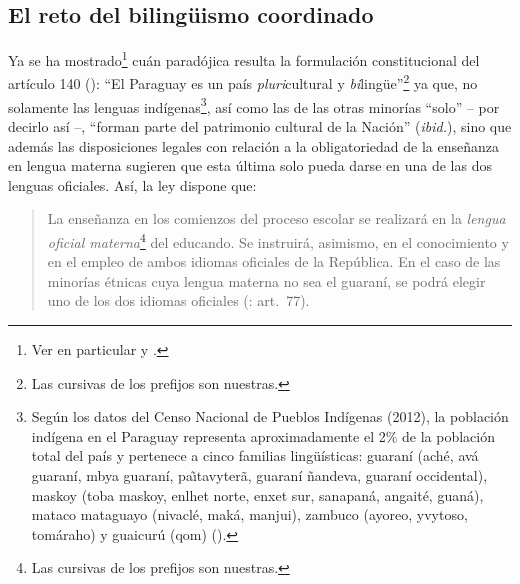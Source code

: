 \documentclass[output=paper]{langscibook}
\begin{document}
\subsection{El reto del bilingüismo coordinado}


Ya se ha mostrado\footnote{Ver en particular \citet{Penner2010} y  \citet{ZuccolilloFrench2002}.}  cuán paradójica resulta la formulación constitucional del artículo 140 (\citealt{RepúblicadelParaguay1992}): “El Paraguay es un país \textit{pluri}cultural y \textit{bi}lingüe”\footnote{Las cursivas de los prefijos son nuestras.} ya que, no solamente las lenguas indígenas\footnote{Según los datos del  Censo Nacional de Pueblos Indígenas (2012), la población indígena en el Paraguay representa aproximadamente el 2\% de la población total del país y pertenece a cinco familias lingüísticas: guaraní (aché, avá guaraní, mbya guaraní, pa\~\i tavyterã, guaraní ñandeva, guaraní occidental), maskoy (toba maskoy, enlhet norte, enxet sur, sanapaná, angaité, guaná), mataco mataguayo (nivaclé, maká, manjui), zambuco (ayoreo, yvytoso, tomáraho) y guaicurú (qom) (\citealt{RepúblicadelParaguay2016}).}, así como las de las otras minorías “solo” -- por decirlo así --, “forman parte del patrimonio cultural de la Nación” (\textit{ibid.}), sino que además las disposiciones legales con relación a la obligatoriedad de la enseñanza en lengua materna sugieren que esta última solo pueda darse en una de las dos lenguas oficiales. Así, la ley dispone que:

\begin{quote}
La enseñanza en los comienzos del proceso escolar se realizará en la \textit{lengua oficial materna}\footnote{Las cursivas de los prefijos son nuestras.} del educando. Se instruirá, asimismo, en el conocimiento y en el empleo de ambos idiomas oficiales de la República. En el caso de las minorías étnicas cuya lengua materna no sea el guaraní, se podrá elegir uno de los dos idiomas oficiales (\citealt{RepúblicadelParaguay1992}: art.~77).
\end{quote}
\end{document}

